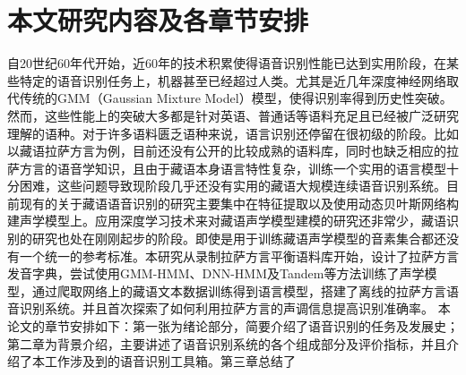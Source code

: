 \section{本文研究内容及各章节安排}
自20世纪60年代开始，近60年的技术积累使得语音识别性能已达到实用阶段，在某些特定的语音识别任务上，机器甚至已经超过人类。尤其是近几年深度神经网络取代传统的GMM（Gaussian Mixture Model）模型，使得识别率得到历史性突破。然而，这些性能上的突破大多都是针对英语、普通话等语料充足且已经被广泛研究理解的语种。对于许多语料匮乏语种来说，语言识别还停留在很初级的阶段。比如以藏语拉萨方言为例，目前还没有公开的比较成熟的语料库，同时也缺乏相应的拉萨方言的语音学知识，且由于藏语本身语言特性复杂，训练一个实用的语言模型十分困难，这些问题导致现阶段几乎还没有实用的藏语大规模连续语音识别系统。目前现有的关于藏语语音识别的研究主要集中在特征提取以及使用动态贝叶斯网络构建声学模型上。应用深度学习技术来对藏语声学模型建模的研究还非常少，藏语识别的研究也处在刚刚起步的阶段。即使是用于训练藏语声学模型的音素集合都还没有一个统一的参考标准。本研究从录制拉萨方言平衡语料库开始，设计了拉萨方言发音字典，尝试使用GMM-HMM、DNN-HMM及Tandem等方法训练了声学模型，通过爬取网络上的藏语文本数据训练得到语言模型，搭建了离线的拉萨方言语音识别系统。并且首次探索了如何利用拉萨方言的声调信息提高识别准确率。
本论文的章节安排如下：第一张为绪论部分，简要介绍了语音识别的任务及发展史；第二章为背景介绍，主要讲述了语音识别系统的各个组成部分及评价指标，并且介绍了本工作涉及到的语音识别工具箱。第三章总结了
